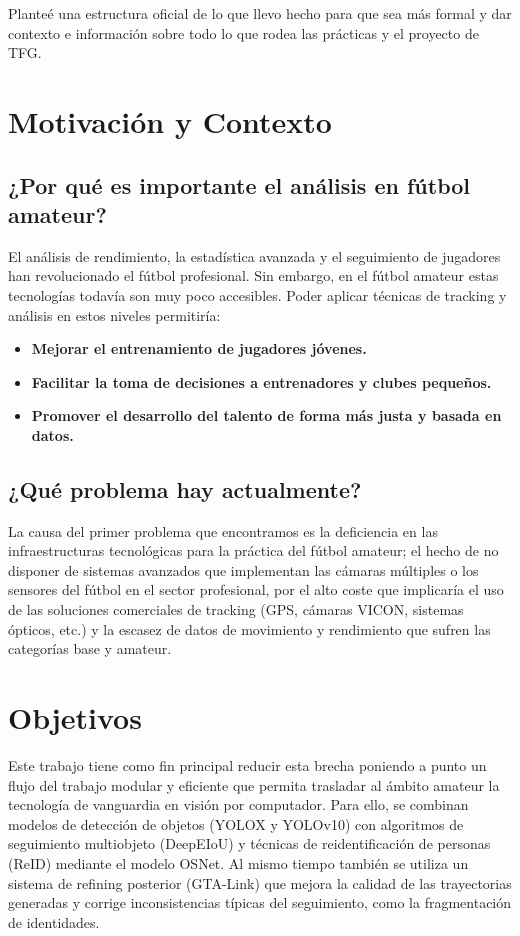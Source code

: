 \documentclass[12pt, a4paper, twoside]{article}
\begin{document}
	Planteé una estructura oficial de lo que llevo hecho para que sea más formal y dar contexto e información sobre todo lo que rodea las prácticas y el proyecto de TFG.
	
	\section{Motivación y Contexto}
	
	\subsection{¿Por qué es importante el análisis en fútbol amateur?}
	
	El análisis de rendimiento, la estadística avanzada y el seguimiento de jugadores han revolucionado el fútbol profesional. Sin embargo, en el fútbol amateur estas tecnologías todavía son muy poco accesibles.
	Poder aplicar técnicas de tracking y análisis en estos niveles permitiría:
	\begin{itemize}
		\item \textbf{Mejorar el entrenamiento de jugadores jóvenes.}
		\item \textbf{Facilitar la toma de decisiones a entrenadores y clubes pequeños.}
		\item \textbf{Promover el desarrollo del talento de forma más justa y basada en datos.}
	\end{itemize}
	
	\subsection{¿Qué problema hay actualmente?}
	
	La causa del primer problema que encontramos es la deficiencia en las infraestructuras tecnológicas para la práctica del fútbol amateur; el hecho de no disponer de sistemas avanzados que implementan las cámaras múltiples o los sensores del fútbol en el sector profesional, por el alto coste que implicaría el uso de las soluciones comerciales de tracking (GPS, cámaras VICON, sistemas ópticos, etc.) y la escasez de datos de movimiento y rendimiento que sufren las categorías base y amateur.
	
	\section{Objetivos}
	
	Este trabajo tiene como fin principal reducir esta brecha poniendo a punto un flujo del trabajo modular y eficiente que permita trasladar al ámbito amateur la tecnología de vanguardia en visión por computador. Para ello, se combinan modelos de detección de objetos (YOLOX y YOLOv10) con algoritmos de seguimiento multiobjeto (DeepEIoU) y técnicas de reidentificación de personas (ReID) mediante el modelo OSNet. Al mismo tiempo también se utiliza un sistema de refining posterior (GTA-Link) que mejora la calidad de las trayectorias generadas y corrige inconsistencias típicas del seguimiento, como la fragmentación de identidades.
	
\end{document}
